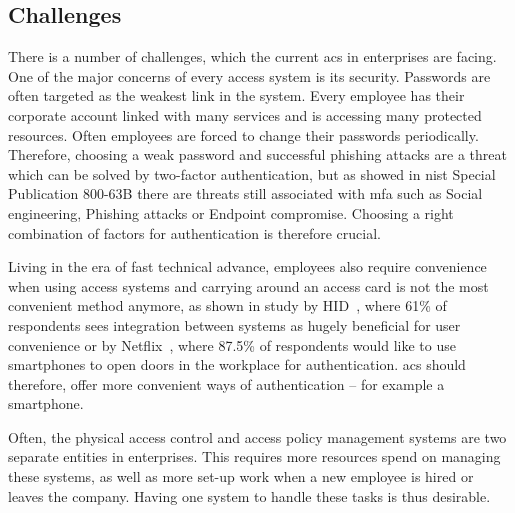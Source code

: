 \subsection{Challenges} \label{challenges}

There is a number of challenges, which the current \acrshort{acs} in enterprises are facing. One of the major concerns of every access system is its security. Passwords are often targeted as the weakest link in the system. Every employee has their corporate account linked with many services and is accessing many protected resources. Often employees are forced to change their passwords periodically. Therefore, choosing a weak password and successful phishing attacks are a threat which can be solved by two-factor authentication, but as showed in \acrshort{nist} Special Publication 800-63B \cite{Grassi2017DigitalManagement} there are threats still associated with \acrshort{mfa} such as Social engineering, Phishing attacks or Endpoint compromise. Choosing a right combination of factors for authentication is therefore crucial.

Living in the era of fast technical advance, employees also require convenience when using access systems and carrying around an access card is not the most convenient method anymore, as shown in study by HID~\cite{2017AccessGlobal}, where 61\% of respondents sees integration between systems as hugely beneficial for user convenience or by Netflix~\cite{2012NetflixPilot}, where 87.5\% of respondents would like to use smartphones to open doors in the workplace for authentication. \acrshort{acs} should therefore, offer more convenient ways of authentication -- for example a smartphone.

Often, the physical access control and access policy management systems are two separate entities in enterprises. This requires more resources spend on managing these systems, as well as more set-up work when a new employee is hired or leaves the company. Having one system to handle these tasks is thus desirable.